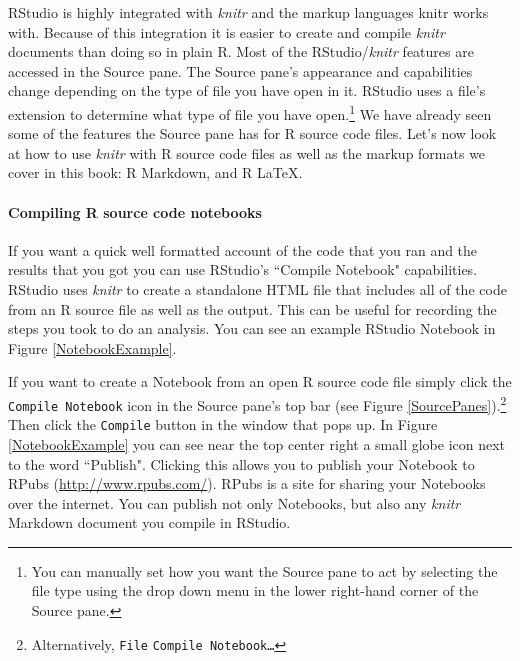 \documentclass[krantz1]{krantz}
\begin{document}
RStudio is highly integrated with {\emph{knitr}} and the markup languages knitr works with. Because of this integration it is easier to create and compile {\emph{knitr}} documents than doing so in plain R. Most of the RStudio/{\emph{knitr}} features are accessed in the Source pane. The Source pane's appearance and capabilities change depending on the type of file you have open in it. RStudio uses a file's extension to determine what type of file you have open.\footnote{You can manually set how you want the Source pane to act by selecting the file type using the drop down menu in the lower right-hand corner of the Source pane.} We have already seen some of the features the Source pane has for R source code files. Let's now look at how to use {\emph{knitr}} with R source code files as well as the markup formats we cover in this book: R Markdown, and R LaTeX. \\[0.25cm]

\paragraph{Compiling R source code notebooks}

If you want a quick well formatted account of the code that you ran and the results that you got you can use RStudio's ``Compile Notebook" capabilities. RStudio uses {\emph{knitr}} to create a standalone HTML file that includes all of the code from an R source file as well as the output. This can be useful for recording the steps you took to do an analysis. You can see an example RStudio Notebook in Figure \ref{NotebookExample}. 

If you want to create a Notebook from an open R source code file simply click the \texttt{Compile Notebook} icon in the Source pane's top bar (see Figure \ref{SourcePanes}).\footnote{Alternatively, \texttt{File} \textrightarrow \; \texttt{Compile Notebook\ldots}} Then click the \texttt{Compile} button in the window that pops up. In Figure \ref{NotebookExample} you can see near the top center right a small globe icon next to the word ``Publish". Clicking this allows you to publish your Notebook to RPubs (\url{http://www.rpubs.com/}). RPubs is a site for sharing your Notebooks over the internet. You can publish not only Notebooks, but also any {\emph{knitr}} Markdown document you compile in RStudio.\label{PublishRPubs}
\end{document}
